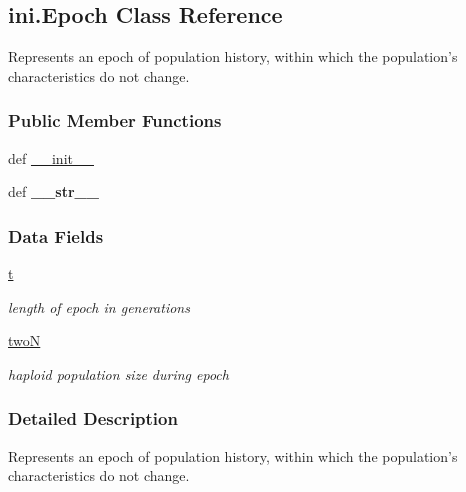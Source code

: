 \hypertarget{classini_1_1_epoch}{\subsection{ini.\+Epoch Class Reference}
\label{classini_1_1_epoch}
}


Represents an epoch of population history, within which the population's characteristics do not change.  


\subsubsection*{Public Member Functions}
\begin{DoxyCompactItemize}
\item 
def \hyperlink{classini_1_1_epoch_aab954d54f8c04e76dd169b4dcb27fefd}{\+\_\+\+\_\+init\+\_\+\+\_\+}
\item 
\hypertarget{classini_1_1_epoch_a18068a5b112c76122d491002f0b44964}{def {\bfseries \+\_\+\+\_\+str\+\_\+\+\_\+}}\label{classini_1_1_epoch_a18068a5b112c76122d491002f0b44964}

\end{DoxyCompactItemize}
\subsubsection*{Data Fields}
\begin{DoxyCompactItemize}
\item 
\hypertarget{classini_1_1_epoch_a603d7e2b4339acbea9d033d7ee52d0a6}{\hyperlink{classini_1_1_epoch_a603d7e2b4339acbea9d033d7ee52d0a6}{t}}\label{classini_1_1_epoch_a603d7e2b4339acbea9d033d7ee52d0a6}

\begin{DoxyCompactList}\small\item\em length of epoch in generations \end{DoxyCompactList}\item 
\hypertarget{classini_1_1_epoch_ada6346e6a8ebbd2277f593dfc9a3e20d}{\hyperlink{classini_1_1_epoch_ada6346e6a8ebbd2277f593dfc9a3e20d}{two\+N}}\label{classini_1_1_epoch_ada6346e6a8ebbd2277f593dfc9a3e20d}

\begin{DoxyCompactList}\small\item\em haploid population size during epoch \end{DoxyCompactList}\end{DoxyCompactItemize}


\subsubsection{Detailed Description}
Represents an epoch of population history, within which the population's characteristics do not change. 




